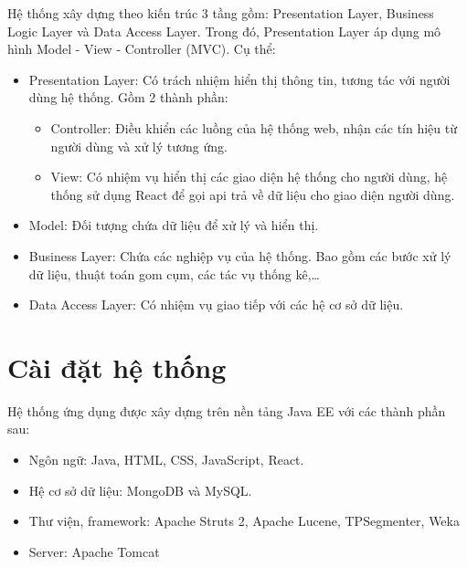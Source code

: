 Hệ thống xây dựng theo kiến trúc 3 tầng gồm: Presentation Layer, Business Logic Layer và Data Access Layer. Trong đó, Presentation Layer áp dụng mô hình Model - View - Controller (MVC). Cụ thể:
	\begin{itemize}
		\item Presentation Layer: Có trách nhiệm hiển thị thông tin, tương tác với người dùng hệ thống. Gồm 2 thành phần:
			\begin{itemize}
				\item Controller: Điều khiển các luồng của hệ thống web, nhận các tín hiệu từ người dùng và xử lý tương ứng.
				\item View: Có nhiệm vụ hiển thị các giao diện hệ thống cho người dùng, hệ thống sử dụng React để gọi api trả về dữ liệu cho giao diện người dùng.
			\end{itemize}
		\item Model: Đối tượng chứa dữ liệu để xử lý và hiển thị.
		\item Business Layer: Chứa các nghiệp vụ của hệ thống. Bao gồm các bước xử lý dữ liệu, thuật toán gom cụm, các tác vụ thống kê,…
		\item Data Access Layer: Có nhiệm vụ giao tiếp với các hệ cơ sở dữ liệu.
	\end{itemize}

\section{Cài đặt hệ thống}%
Hệ thống ứng dụng được xây dựng trên nền tảng Java EE với các thành phần sau:
	\begin{itemize}
		\item Ngôn ngữ: Java, HTML, CSS, JavaScript, React.
		\item Hệ cơ sở dữ liệu: MongoDB và MySQL.
		\item Thư viện, framework: Apache Struts 2, Apache Lucene, TPSegmenter, Weka
		\item Server: Apache Tomcat
	\end{itemize}

